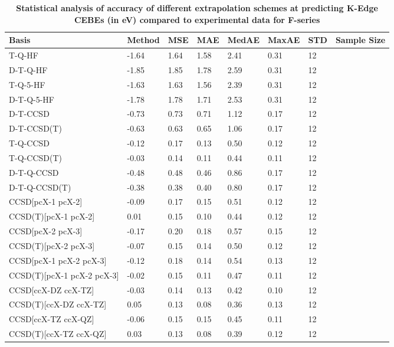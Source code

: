 \begin{table}
  \caption{\textbf{Statistical analysis of accuracy of different extrapolation schemes at predicting K-Edge CEBEs (in eV) compared to experimental data for F-series}}
  \label{tbl:extrap-scheme-summary-f}
  \begin{tabular}{l l l l l l l l }
    \toprule
    \textbf{Basis} & \textbf{Method} & \textbf{MSE} & \textbf{MAE} & \textbf{MedAE} & \textbf{MaxAE} & \textbf{STD} & \textbf{Sample Size} \\ 
    \midrule
    T-Q-HF & -1.64 & 1.64 & 1.58 & 2.41 & 0.31 & 12 \\ 
    D-T-Q-HF & -1.85 & 1.85 & 1.78 & 2.59 & 0.31 & 12 \\ 
    T-Q-5-HF & -1.63 & 1.63 & 1.56 & 2.39 & 0.31 & 12 \\ 
    D-T-Q-5-HF & -1.78 & 1.78 & 1.71 & 2.53 & 0.31 & 12 \\ 
    D-T-CCSD & -0.73 & 0.73 & 0.71 & 1.12 & 0.17 & 12 \\ 
    D-T-CCSD(T) & -0.63 & 0.63 & 0.65 & 1.06 & 0.17 & 12 \\ 
    T-Q-CCSD & -0.12 & 0.17 & 0.13 & 0.50 & 0.12 & 12 \\ 
    T-Q-CCSD(T) & -0.03 & 0.14 & 0.11 & 0.44 & 0.11 & 12 \\ 
    D-T-Q-CCSD & -0.48 & 0.48 & 0.46 & 0.86 & 0.17 & 12 \\ 
    D-T-Q-CCSD(T) & -0.38 & 0.38 & 0.40 & 0.80 & 0.17 & 12 \\ 
    CCSD[pcX-1 pcX-2] & -0.09 & 0.17 & 0.15 & 0.51 & 0.12 & 12 \\ 
    CCSD(T)[pcX-1 pcX-2] & 0.01 & 0.15 & 0.10 & 0.44 & 0.12 & 12 \\ 
    CCSD[pcX-2 pcX-3] & -0.17 & 0.20 & 0.18 & 0.57 & 0.15 & 12 \\ 
    CCSD(T)[pcX-2 pcX-3] & -0.07 & 0.15 & 0.14 & 0.50 & 0.12 & 12 \\ 
    CCSD[pcX-1 pcX-2 pcX-3] & -0.12 & 0.18 & 0.14 & 0.54 & 0.13 & 12 \\ 
    CCSD(T)[pcX-1 pcX-2 pcX-3] & -0.02 & 0.15 & 0.11 & 0.47 & 0.11 & 12 \\ 
    CCSD[ccX-DZ ccX-TZ] & -0.03 & 0.14 & 0.13 & 0.42 & 0.10 & 12 \\ 
    CCSD(T)[ccX-DZ ccX-TZ] & 0.05 & 0.13 & 0.08 & 0.36 & 0.13 & 12 \\ 
    CCSD[ccX-TZ ccX-QZ] & -0.06 & 0.15 & 0.15 & 0.45 & 0.11 & 12 \\ 
    CCSD(T)[ccX-TZ ccX-QZ] & 0.03 & 0.13 & 0.08 & 0.39 & 0.12 & 12 \\ 

\end{tabular}
\end{table}
